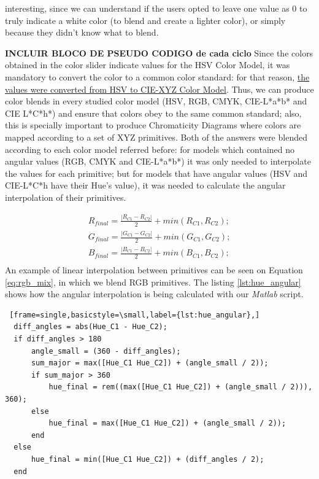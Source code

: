 interesting, since we can understand if the users opted to leave one value as 0 to truly indicate a white color (to blend and create a lighter color), or simply because they
didn't know what to blend. \par
%
\textbf{INCLUIR BLOCO DE PSEUDO CODIGO de cada ciclo}
%
%
Since the colors obtained in the color slider indicate values for the HSV Color Model, it was mandatory to convert the color to a common color standard: for that reason,
\ul{the values were converted from HSV to CIE-XYZ Color Model}. Thus, we can produce color blends in every studied color model (\gls{HSV}, \gls{RGB}, \gls{CMYK}, CIE-L*a*b* and
CIE L*C*h*) and ensure that colors obey to the same common standard; also, this is specially important to produce Chromaticity Diagrams where colors are mapped according to a set
of XYZ primitives. Both of the answers were blended according to each color model referred before: for models which contained no angular values (\gls{RGB}, \gls{CMYK} and
CIE-L*a*b*) it was only needed to interpolate the values for each primitive; but for models that have angular values (\gls{HSV} and CIE-L*C*h have their Hue's value), it was
needed to calculate the angular interpolation of their primitives. \par
%
\begin{equation}
  \label{eq:rgb_mix}
  \begin{aligned}
    R_{final} = \frac{|R_{C1} - R_{C2}|}{2} + min(R_{C1}, R_{C2}); \\
    G_{final} = \frac{|G_{C1} - G_{C2}|}{2} + min(G_{C1}, G_{C2}); \\
    B_{final} = \frac{|B_{C1} - B_{C2}|}{2} + min(B_{C1}, B_{C2}); \\
  \end{aligned}
\end{equation}
%
An example of linear interpolation between primitives can be seen on Equation \ref{eq:rgb_mix}, in which we blend \gls{RGB} primitives. The listing \ref{lst:hue_angular} shows
how the angular interpolation is being calculated with our \emph{Matlab} script.
%
\begin{lstlisting} [frame=single,basicstyle=\small,label={lst:hue_angular},]
  diff_angles = abs(Hue_C1 - Hue_C2);
  if diff_angles > 180
      angle_small = (360 - diff_angles);
      sum_major = max([Hue_C1 Hue_C2]) + (angle_small / 2));
      if sum_major > 360
          hue_final = rem((max([Hue_C1 Hue_C2]) + (angle_small / 2))), 360);
      else
          hue_final = max([Hue_C1 Hue_C2]) + (angle_small / 2));
      end
  else
      hue_final = min([Hue_C1 Hue_C2]) + (diff_angles / 2);
  end
\end{lstlisting}
